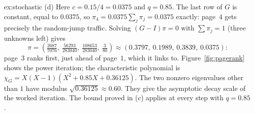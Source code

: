 \begin{solution}{ex:stochastic}
(d) Here $c=0.15/4=0.0375$ and $q=0.85$. The last row of $G$ is constant, equal to $0.0375$, so $\pi_4=0.0375\sum_j\pi_j=0.0375$ exactly: page~$4$ gets precisely the random-jump traffic. Solving $(G-I)\pi=0$ with $\sum\pi_j=1$ (three unknowns left) gives
\[
\pi=\left(\tfrac{2687}{7076},\ \tfrac{56293}{283040},\ \tfrac{108653}{283040},\ \tfrac{3}{80}\right)\approx(0.3797,\ 0.1989,\ 0.3839,\ 0.0375):
\]
page~$3$ ranks first, just ahead of page~$1$, which it links to. Figure~\ref{fig:pagerank} shows the power iteration; the characteristic polynomial is $\chi_G=X(X-1)(X^2+0.85X+0.36125)$. The two nonzero eigenvalues other than $1$ have modulus $\sqrt{0.36125}\approx0.60$. They give the asymptotic decay scale of the worked iteration. The bound proved in (c) applies at every step with $q=0.85$.
\end{solution}


